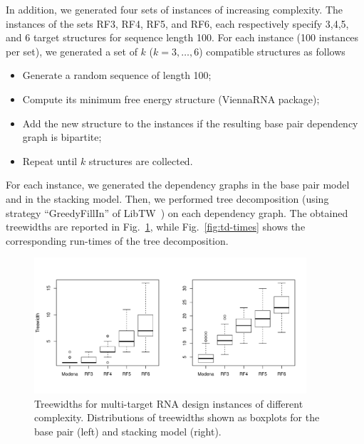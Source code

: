 \documentclass[10pt]{article}
\newcommand{\citep}[1]{\cite{#1}}
\begin{document}
In addition, we generated four sets of instances of increasing
complexity. The instances of the sets RF3, RF4, RF5, and RF6, each
respectively specify 3,4,5, and 6 target structures for sequence
length 100.  For each instance (100 instances per set), we generated a
set of $k$ ($k=3,\dots,6$) compatible structures as follows
\begin{itemize}
\item Generate a random sequence of length 100;
\item Compute its minimum free energy structure (ViennaRNA package);
\item Add the new structure to the instances if the resulting base pair dependency graph is bipartite;
\item Repeat until $k$ structures are collected.
\end{itemize}
For each instance, we generated the dependency graphs in the base pair
model and in the stacking model. Then, we performed tree decomposition
(using strategy ``GreedyFillIn'' of LibTW~\citep{Dijk2006}) on each dependency
graph. The obtained treewidths are reported in
Fig.~\ref{fig:td-widths}, while Fig.~\ref{fig:td-times} shows the
corresponding run-times of the tree decomposition.

\begin{figure}[h!]
  \centering\includegraphics[width=0.9\textwidth]{Figs/td-widths}
  \caption{Treewidths for multi-target RNA design instances of
    different complexity. Distributions of treewidths shown as boxplots for the base pair (left) and stacking model (right).}
  \label{fig:td-widths}
\end{figure}
\end{document}
